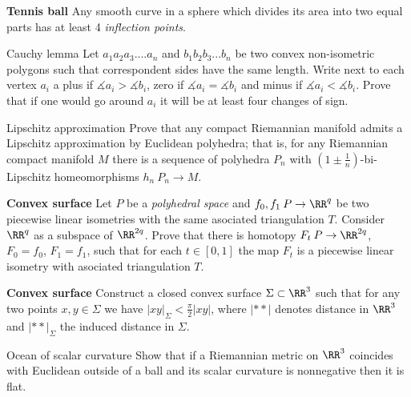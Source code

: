 \begin{pr}
{\bf  Tennis ball} \cite{arnold}\cite{angenent} Any smooth curve in a sphere which divides its area into two equal parts has at least 4 {\it inflection points}.
\end{pr}

\begin{pr}{\easy}{Cauchy lemma} Let $a_1a_2a_3....a_n$ and $b_1b_2b_3...b_n$ be two convex non-isometric polygons such that correspondent sides have the same length.
Write next to each vertex $a_i$  a plus if $\measuredangle a_i>\measuredangle b_i$, zero if  $\measuredangle a_i=\measuredangle b_i$ and minus if $\measuredangle a_i<\measuredangle b_i$.
Prove that if one would go around $a_i$ it will be at least four changes of sign.
\end{pr}

\begin{pr}{}{Lipschitz approximation}
Prove that any compact Riemannian manifold admits a Lipschitz approximation by Euclidean polyhedra; 
that is, for any Riemannian compact manifold $M$ there is a sequence of polyhedra $P_n$ with $(1\pm\tfrac1n)$-bi-Lipschitz homeomorphisms $h_n\:P_n\to M$.
\end{pr}

\begin{pr}{}
{\bf  Convex surface}
Let $P$ be a \emph{polyhedral space} and $f_0,f_1\:P\to \RR^q$ be two piecewise linear isometries with the same asociated triangulation $T$.
Consider $\RR^q$ as a subspace of $\RR^{2q}$.
Prove that there is homotopy $F_t\:P\to\RR^{2q}$, $F_0=f_0$, $F_1=f_1$, such that for each $t\in[0,1]$ the map $F_t$ is a piecewise linear isometry with asociated triangulation $T$.
\end{pr}

\begin{pr}{}
{\bf  Convex surface}
Construct a closed convex surface $\Sigma\subset \RR^3$ such that for any two points $x,y\in \Sigma$ we have $|x y|_\Sigma< \frac{\pi}{2}|x y|$, where $|**|$ denotes distance in $\RR^3$ and $|**|_\Sigma$ the induced distance in $\Sigma$.
\end{pr}

\begin{pr}{}{Ocean of scalar curvature} Show that if a Riemannian metric on $\RR^3$ coincides with Euclidean outside of a ball and its scalar curvature is nonnegative then it is flat.
\end{pr}

